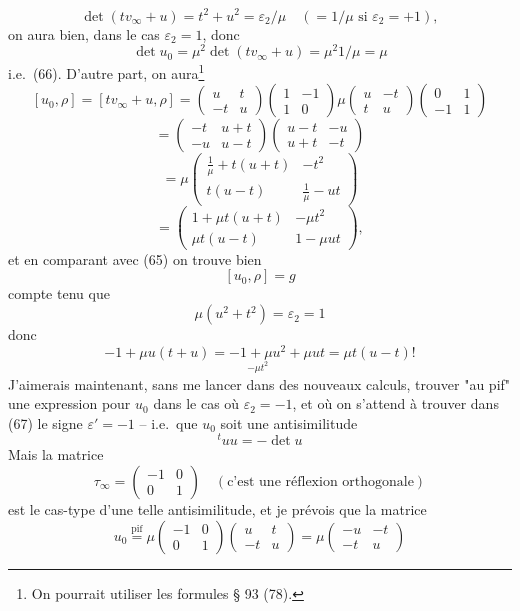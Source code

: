 \begin{enumerate}
$$
\det(t v_\infty + u) = t^2 + u^2 = \varepsilon_2 / \mu \quad (= 1 / \mu \text{ si } \varepsilon_2 = +1) ,
$$
on aura bien, dans le cas $\varepsilon_2 = 1$, donc
$$
\det u_0 = \mu^2 \det(t v_\infty + u) = \mu^2 1/\mu = \mu
$$
i.e.\ (66). D'autre part, on aura\footnote{On pourrait utiliser les formules § 93 (78).}
$$
[u_0, \rho] = [t v_\infty + u, \rho] = \begin{pmatrix} u & t \\ -t & u \end{pmatrix} \begin{pmatrix} 1 & -1 \\ 1 & 0 \end{pmatrix} \mu \begin{pmatrix} u & -t \\ t & u \end{pmatrix} \begin{pmatrix} 0 & 1 \\ -1 & 1 \end{pmatrix}
$$
$$
= \begin{pmatrix} -t & u+t \\ -u & u-t \end{pmatrix} \begin{pmatrix} u-t & -u \\ u+t & -t \end{pmatrix}
$$
$$
= \mu \begin{pmatrix} \frac{1}{\mu} + t(u+t) & -t^2 \\ t(u-t) & \frac{1}{\mu} - ut \end{pmatrix}
$$
$$
= \begin{pmatrix} 1 + \mu t(u+t) & -\mu t^2 \\ \mu t(u-t) & 1 - \mu ut \end{pmatrix} ,
$$
et en comparant avec (65) on trouve bien
$$
[u_0, \rho] = g
$$
compte tenu que
$$
\mu(u^2+t^2) = \varepsilon_2 = 1
$$
donc
$$
-1 + \mu u(t+u) = \underset{-\mu t^2}{-1 + \mu u^2} + \mu ut = \mu t(u-t) !
$$
J'aimerais maintenant, sans me lancer dans des nouveaux calculs, trouver "au pif" une expression pour $u_0$ dans le cas où $\varepsilon_2 = -1$, et où on s'attend à trouver dans (67) le signe $\varepsilon' = -1$ -- i.e.\ que $u_0$ soit une antisimilitude
$$
{}^t u u = - \det u
$$
Mais la matrice
$$
\tau_\infty = \begin{pmatrix} -1 & 0 \\ 0 & 1 \end{pmatrix} \quad (\text{c'est une réflexion orthogonale})
$$
est le cas-type d'une telle antisimilitude, et je prévois que la matrice
$$
u_0 \overset{\text{pif}}{=} \mu \begin{pmatrix} -1 & 0 \\ 0 & 1 \end{pmatrix} \begin{pmatrix} u & t \\ -t & u \end{pmatrix} = \mu \begin{pmatrix} -u & -t \\ -t & u \end{pmatrix}
$$


\end{enumerate}
